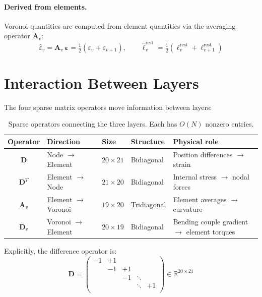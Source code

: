 \documentclass[11pt]{article}
\newcommand{\mat}[1]{\mathbf{#1}}
\newcommand{\Real}{\mathbb{R}}
\begin{document}
\paragraph{Derived from elements.}
Voronoi quantities are computed from element quantities via the averaging operator $\mat{A}_v$:
\begin{equation}
  \hat{\varepsilon}_v = \mat{A}_v\,\bm{\varepsilon} = \tfrac{1}{2}(\varepsilon_v + \varepsilon_{v+1}), \qquad
  \hat{\ell}_v^{\text{rest}} = \tfrac{1}{2}(\ell_v^{\text{rest}} + \ell_{v+1}^{\text{rest}})
\end{equation}

\section{Interaction Between Layers}

The four sparse matrix operators move information between layers:

\begin{table}[H]
  \centering
  \renewcommand{\arraystretch}{1.3}
  \begin{tabular}{cllll}
    \toprule
    Operator & Direction & Size & Structure & Physical role \\
    \midrule
    $\mat{D}$ & Node $\to$ Element & $20 \times 21$ & Bidiagonal & Position differences $\to$ strain \\
    $\mat{D}^T$ & Element $\to$ Node & $21 \times 20$ & Bidiagonal & Internal stress $\to$ nodal forces \\
    $\mat{A}_v$ & Element $\to$ Voronoi & $19 \times 20$ & Tridiagonal & Element averages $\to$ curvature \\
    $\mat{D}_v$ & Voronoi $\to$ Element & $20 \times 19$ & Bidiagonal & Bending couple gradient $\to$ element torques \\
    \bottomrule
  \end{tabular}
  \caption{Sparse operators connecting the three layers.  Each has $O(N)$ nonzero entries.}
  \label{tab:operators}
\end{table}

\noindent
Explicitly, the difference operator is:
\begin{equation}
  \mat{D} =
  \begin{pmatrix}
    -1 & +1 &    &        &    \\
       & -1 & +1 &        &    \\
       &    & -1 & \ddots &    \\
       &    &    & \ddots & +1 \\
  \end{pmatrix}
  \in \Real^{20 \times 21}
  \label{eq:D-explicit}
\end{equation}
\end{document}
